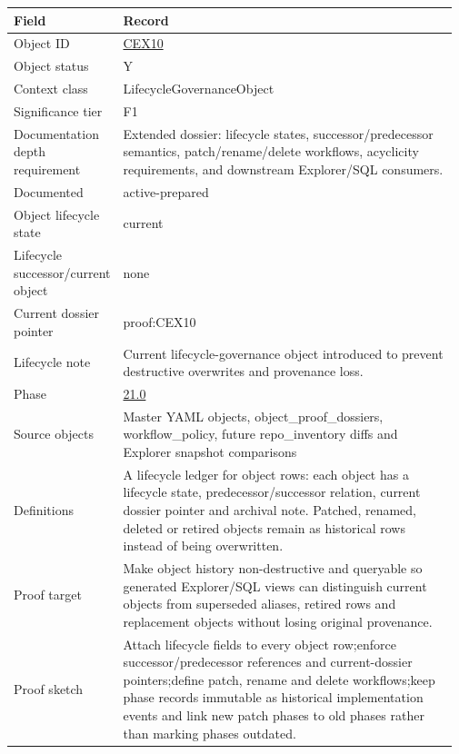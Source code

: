 \begin{longtable}{L{0.16\linewidth} L{0.81\linewidth}}
\hline
\textbf{Field} & \textbf{Record}\\
\hline
Object ID & \hyperlink{object-row-CEX10}{CEX10}\\
\hline\addlinespace[0.20em]
Object status & Y\\
\hline\addlinespace[0.20em]
Context class & LifecycleGovernanceObject\\
\hline\addlinespace[0.20em]
Significance tier & F1\\
\hline\addlinespace[0.20em]
Documentation depth requirement & Extended dossier: lifecycle states, successor/\allowbreak{}predecessor semantics, patch/\allowbreak{}rename/\allowbreak{}delete workflows, acyclicity requirements, and downstream Explorer/\allowbreak{}SQL consumers.\\
\hline\addlinespace[0.20em]
Documented & active-prepared\\
\hline\addlinespace[0.20em]
Object lifecycle state & current\\
\hline\addlinespace[0.20em]
Lifecycle successor/\allowbreak{}current object & none\\
\hline\addlinespace[0.20em]
Current dossier pointer & proof:CEX10\\
\hline\addlinespace[0.20em]
Lifecycle note & Current lifecycle-governance object introduced to prevent destructive overwrites and provenance loss.\\
\hline\addlinespace[0.20em]
Phase & \hyperlink{phase-row-21-0}{21.0}\\
\hline\addlinespace[0.20em]
Source objects & Master YAML objects, object\_proof\_dossiers, workflow\_policy, future repo\_inventory diffs and Explorer snapshot comparisons\\
\hline\addlinespace[0.20em]
Definitions & A lifecycle ledger for object rows: each object has a lifecycle state, predecessor/\allowbreak{}successor relation, current dossier pointer and archival note. Patched, renamed, deleted or retired objects remain as historical rows instead of being overwritten.\\
\hline\addlinespace[0.20em]
Proof target & Make object history non-destructive and queryable so generated Explorer/\allowbreak{}SQL views can distinguish current objects from superseded aliases, retired rows and replacement objects without losing original provenance.\\
\hline\addlinespace[0.20em]
Proof sketch & Attach lifecycle fields to every object row;\newline enforce successor/\allowbreak{}predecessor references and current-dossier pointers;\newline define patch, rename and delete workflows;\newline keep phase records immutable as historical implementation events and link new patch phases to old phases rather than marking phases outdated.\\

\end{longtable}
